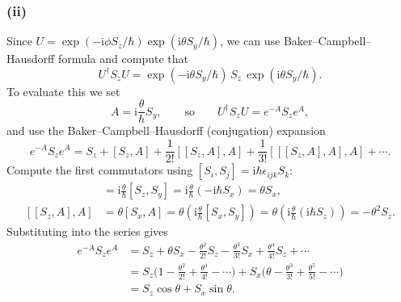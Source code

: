 \documentclass{article}
\newcommand{\ii}{\mathrm{i}}
\begin{document}
\subsubsection*{(ii)}
Since $U=\exp(-\ii \phi S_z/\hbar)\exp(\ii \theta S_y/\hbar)$, we can use Baker–Campbell–Hausdorff formula and compute that
\begin{equation}
    U^\dagger S_z U=\exp(-\ii \theta S_y/\hbar)\,S_z\,\exp(\ii \theta S_y/\hbar).
\end{equation}
To evaluate this we set
\[A=\ii\frac{\theta}{\hbar}S_y,\qquad\text{so}\qquad U^\dagger S_z U=e^{-A}S_z e^{A},\]
and use the Baker--Campbell--Hausdorff (conjugation) expansion
\[e^{-A}S_z e^{A}=S_z+[S_z,A]+\frac{1}{2!}[[S_z,A],A]+\frac{1}{3!}[[[S_z,A],A],A]+\cdots.\]
Compute the first commutators using $[S_i,S_j]=\ii\hbar\epsilon_{ijk}S_k$:
\begin{align*}
    [S_z,A]&=\ii\frac{\theta}{\hbar}[S_z,S_y]=\ii\frac{\theta}{\hbar}(-\ii\hbar S_x)=\theta S_x,\\
    [[S_z,A],A]&=\theta[S_x,A]=\theta\left(\ii\frac{\theta}{\hbar}[S_x,S_y]\right)=\theta\left(\ii\frac{\theta}{\hbar}(\ii\hbar S_z)\right)=-\theta^2 S_z.
\end{align*}
Substituting into the series gives
\begin{align*}
    e^{-A}S_z e^{A}&=S_z+\theta S_x-\frac{\theta^2}{2!}S_z-\frac{\theta^3}{3!}S_x+\frac{\theta^4}{4!}S_z+\cdots\\
    &=S_z\Big(1-\frac{\theta^2}{2!}+\frac{\theta^4}{4!}-\cdots\Big)+S_x\Big(\theta-\frac{\theta^3}{3!}+\frac{\theta^5}{5!}-\cdots\Big)\\
    &=S_z\cos\theta+S_x\sin\theta.
\end{align*}


%
%
\end{document}
